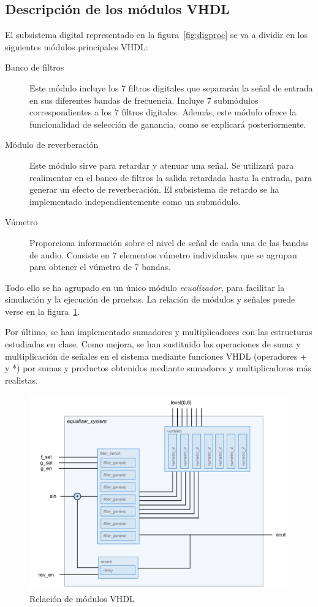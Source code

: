 \documentclass[a4paper,12pt]{article}
\begin{document}
\subsection{Descripción de los módulos VHDL}
El subsistema digital representado en la figura~\ref{fig:digproc} se va a dividir en los siguientes módulos principales VHDL:
\begin{description}
\item[Banco de filtros] Este módulo incluye los 7 filtros digitales que separarán la señal de entrada en sus diferentes bandas de frecuencia. Incluye 7 submódulos correspondientes a los 7 filtros digitales. Además, este módulo ofrece la funcionalidad de selección de ganancia, como se explicará posteriormente.
\item[Módulo de reverberación] Este módulo sirve para retardar y atenuar una señal. Se utilizará para realimentar en el banco de filtros la salida retardada hasta la entrada, para generar un efecto de reverberación. El subsistema de retardo se ha implementado independientemente como un submódulo.
\item[Vúmetro] Proporciona información sobre el nivel de señal de cada una de las bandas de audio. Consiste en 7 elementos vúmetro individuales que se agrupan para obtener el vúmetro de 7 bandas.
\end{description}

Todo ello se ha agrupado en un único módulo \emph{ecualizador}, para facilitar la simulación y la ejecución de pruebas. La relación de módulos y señales puede verse en la figura~\ref{fig:vhdl_schema}.

Por último, se han implementado sumadores y multiplicadores con las estructuras estudiadas en clase. Como mejora, se han sustituido las operaciones de suma y multiplicación de señales en el sistema mediante funciones VHDL (operadores + y *) por sumas y productos obtenidos mediante sumadores y multiplicadores más realistas.

\begin{figure}[hbt]
\includegraphics[width=\textwidth]{img/vhdl_schema.pdf} 
\caption{Relación de módulos VHDL} \label{fig:vhdl_schema}
\end{figure}
\end{document}
